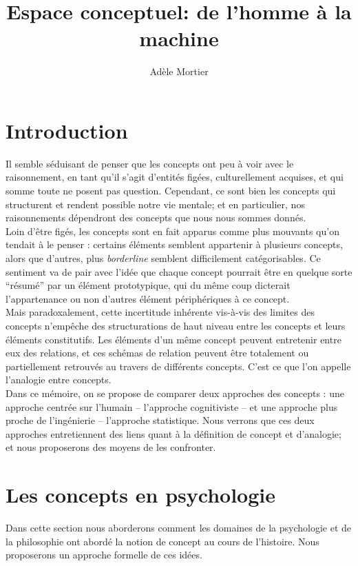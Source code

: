 \documentclass[french]{article}
\author{Adèle Mortier}
\title{Espace conceptuel: de l'homme à la machine}
\begin{document}
	\maketitle
	\nocite{*}
	\section*{Introduction}
		Il semble séduisant de penser que les concepts ont peu à voir avec le raisonnement, en tant qu'il s'agit d'entités figées, culturellement acquises, et qui somme toute ne posent pas question. Cependant, ce sont bien les concepts qui structurent et rendent possible notre vie mentale; et en particulier, nos raisonnements dépendront des concepts que nous nous sommes donnés.\\
		Loin d'être figés, les concepts sont en fait apparus comme plus mouvants qu'on tendait à le penser : certains éléments semblent appartenir à plusieurs concepts, alors que d'autres, plus \textit{borderline} semblent difficilement catégorisables. Ce sentiment va de pair avec l'idée que chaque concept pourrait être en quelque sorte ``résumé'' par un élément prototypique, qui du même coup dicterait l'appartenance ou non d'autres élément périphériques à ce concept.\\
		Mais paradoxalement, cette incertitude inhérente vis-à-vis des limites des concepts n'empêche des structurations de haut niveau entre les concepts et leurs éléments constitutifs. Les éléments d'un même concept peuvent entretenir entre eux des relations, et ces schémas de relation peuvent être totalement ou partiellement retrouvés au travers de différents concepts. C'est ce que l'on appelle l'analogie entre concepts.\\
		Dans ce mémoire, on se propose de comparer deux approches des concepts : une approche centrée sur l'humain -- l'approche cognitiviste -- et une approche plus proche de l'ingénierie -- l'approche statistique. Nous verrons que ces deux approches entretiennent des liens quant à la définition de concept et d'analogie; et nous proposerons des moyens de les confronter.
	\section{Les concepts en psychologie}
		Dans cette section nous aborderons comment les domaines de la psychologie et de la philosophie ont abordé la notion de concept au cours de l'histoire. Nous proposerons un approche formelle de ces idées.
\end{document}
